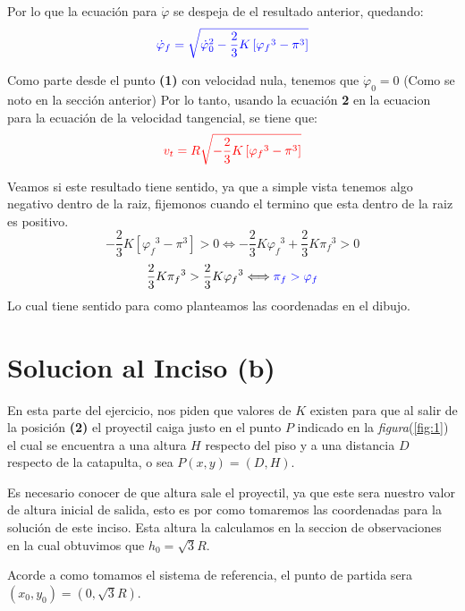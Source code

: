 \documentclass[fleqn,10pt]{SelfArx} %
\newcommand{\sii}{\Longleftrightarrow}
\newcommand{\azul}[1]{\color{blue}{#1}}
\newcommand{\rojo}[1]{\color{red}{#1}}
\begin{document}
Por lo que la ecuación para ${\dot{\varphi}}$ se despeja de el resultado anterior, quedando:
\begin{equation}
\azul{\dot{\varphi}_f = \sqrt{{\dot{\varphi}_0}^2 - \frac{2}{3} K \left[{{\varphi}_f}^3 - {\pi}^3\right]}}
\end{equation}

Como parte desde el punto \textbf{(1)} con velocidad nula, tenemos que $\dot{\varphi}_0=0$ (Como se noto en la sección anterior)
Por lo tanto, usando la ecuación \textbf{2} en la ecuacion para la ecuación de la velocidad tangencial, se tiene que:
\begin{equation}
\rojo{v_t = R \sqrt{ - \frac{2}{3} K \left[ {{\varphi}_f}^3 - {\pi}^3 \right]}}
\end{equation}

Veamos si este resultado tiene sentido, ya que a simple vista tenemos algo negativo dentro de la raiz, fijemonos cuando el termino que esta dentro de la raiz es positivo.
\[- \frac{2}{3} K \left[{{\varphi}_f}^3 - {\pi}^3\right] > 0 \sii - \frac{2}{3} K {{\varphi}_f}^3 + \frac{2}{3} K {{\pi}_f}^3 > 0\]
\[ \frac{2}{3} K {{\pi}_f}^3 > \frac{2}{3} K {{\varphi}_f}^3 \sii \azul{{\pi}_f > {\varphi}_f}\]
Lo cual tiene sentido para como planteamos las coordenadas en el dibujo.

\section{Solucion al Inciso (b)}
En esta parte del ejercicio, nos piden que valores de $K$ existen para que al salir de la posición \textbf{(2)} el proyectil caiga justo en el punto $P$ indicado en la \textit{figura}(\ref{fig:1}) el cual se encuentra a una altura $H$ respecto del piso y a una distancia $D$ respecto de la catapulta, o sea $P(x,y) = (D, H)$. 

Es necesario conocer de que altura sale el proyectil, ya que este sera nuestro valor de altura inicial de salida, esto es por como tomaremos las coordenadas para la solución de este inciso. Esta altura la calculamos en la seccion de observaciones en la cual obtuvimos que $h_0 = \sqrt{3} R$. 

Acorde a como tomamos el sistema de referencia, el punto de partida sera $(x_0,y_0) = (0, \sqrt{3} R)$. 
\end{document}
